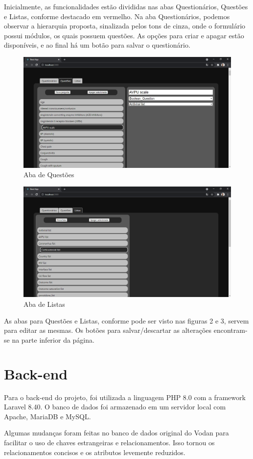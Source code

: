 \documentclass[12pt]{article}
\begin{document}
Inicialmente, as funcionalidades estão divididas nas abas
Questionários, Questões e Listas, conforme destacado
em vermelho. Na aba Questionários,
podemos observar a hierarquia proposta,
sinalizada pelos tons de cinza,
onde o formulário possui módulos, os quais possuem questões.
As opções para criar e apagar estão disponíveis,
e ao final há um botão para salvar o questionário.

\begin{figure}[ht]
	\centering
	\includegraphics[width=.5\textwidth]{questoes.png}
	\caption{Aba de Questões}
	\label{fig:Figura2}
\end{figure}

\begin{figure}[ht]
	\centering
	\includegraphics[width=.5\textwidth]{listas.png}
	\caption{Aba de Listas}
	\label{fig:Figura3}
\end{figure}

As abas para Questões e Listas,
conforme pode ser visto nas figuras 2 e 3,
servem para editar as mesmas.
Os botões para salvar/descartar as alterações
encontram-se na parte inferior da página.

\section{Back-end}

Para o back-end do projeto, foi utilizada
a linguagem PHP 8.0 com a framework Laravel 8.40.
O banco de dados foi armazenado em um servidor
local com Apache, MariaDB e MySQL.

Algumas mudanças foram feitas no banco
de dados original do Vodan para facilitar
o uso de chaves estrangeiras e relacionamentos.
Isso tornou os relacionamentos concisos
e os atributos levemente reduzidos.
\end{document}
